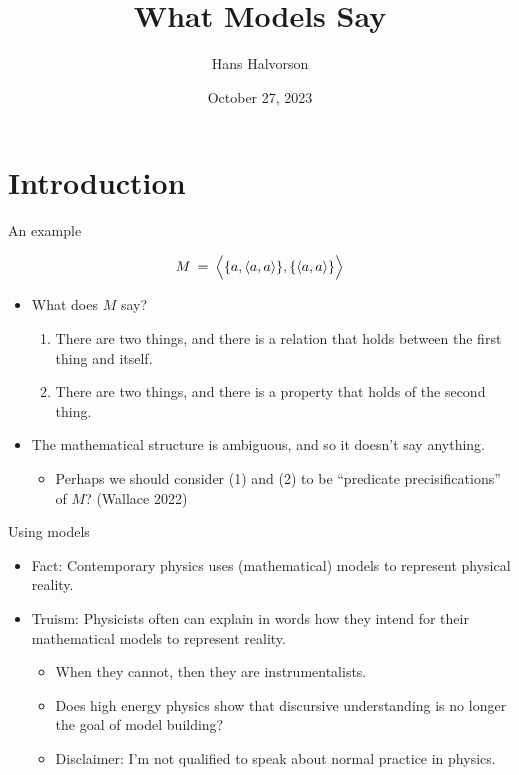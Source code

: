 \documentclass{beamer}
\title{What Models Say}
\author{Hans Halvorson}
\date{October 27, 2023}
\begin{document}
\begin{frame}[plain]

  \titlepage

\end{frame}

\section{Introduction}

\newcommand{\e}{\emptyset}

\begin{frame}{An example}

\[ M \: = \: \Bigl\langle \{ a,\langle a,a\rangle  \} ,\{ \langle a,a\rangle \}
  \Bigr\rangle \]

\bigskip 

\begin{itemize}
\item What does $M$ say?
    \begin{enumerate}
    \item There are two things, and there is a relation that holds
      between the first thing and itself.
    \item There are two things, and there is a property that holds of
      the second thing.
    \end{enumerate}
  \item The mathematical structure is ambiguous, and so it doesn't say
    anything.
    \begin{itemize}
    \item Perhaps we should consider (1) and (2) to be ``predicate
      precisifications'' of $M$? (Wallace 2022)
    \end{itemize}
  \end{itemize}

\end{frame}

\begin{frame}{Using models}

  \begin{itemize}
  \item Fact: Contemporary physics uses (mathematical) models to
    represent physical reality.
    
  \item Truism: Physicists often can explain in words how they intend
    for their mathematical models to represent reality.

    \begin{itemize}
    \item When they cannot, then they are instrumentalists.
    \item Does high energy physics show that discursive understanding
      is no longer the goal of model building?
    \item Disclaimer: I'm not qualified to speak about normal practice
      in physics.
    \end{itemize}
  \end{itemize}  

  \end{frame}
\end{document}
